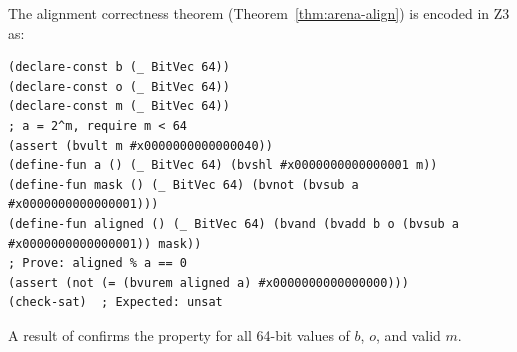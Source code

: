 The alignment correctness theorem (Theorem~\ref{thm:arena-align}) is
encoded in Z3 as:

\begin{lstlisting}[language={},morekeywords={declare-const,assert,check-sat,forall,bvand,bvnot,bvsub,bvadd,bvurem}]
(declare-const b (_ BitVec 64))
(declare-const o (_ BitVec 64))
(declare-const m (_ BitVec 64))
; a = 2^m, require m < 64
(assert (bvult m #x0000000000000040))
(define-fun a () (_ BitVec 64) (bvshl #x0000000000000001 m))
(define-fun mask () (_ BitVec 64) (bvnot (bvsub a #x0000000000000001)))
(define-fun aligned () (_ BitVec 64) (bvand (bvadd b o (bvsub a #x0000000000000001)) mask))
; Prove: aligned % a == 0
(assert (not (= (bvurem aligned a) #x0000000000000000)))
(check-sat)  ; Expected: unsat
\end{lstlisting}

A result of \unsat{} confirms the property for all 64-bit values
of $b$, $o$, and valid $m$.

